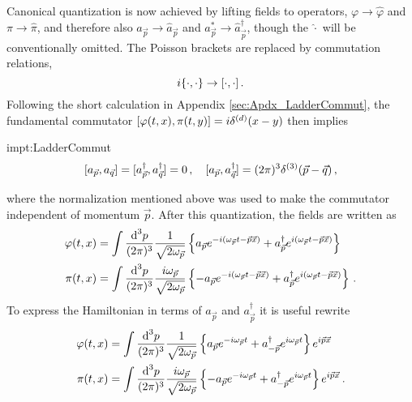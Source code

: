 Canonical quantization is now achieved by lifting fields to operators, $\varphi\to\hat{\varphi}$ and $\pi\to\hat{\pi}$, and therefore also $a_{\vec{p}}\to\hat{a}_{\vec{p}}$ and $a_{\vec{p}}^*\to\hat{a}_{\vec{p}}^\dagger$, though the $\hat{\cdot}$ will be conventionally omitted. The Poisson brackets are replaced by commutation relations,
\begin{equation}
    {i}\{\cdot,\cdot\}\to{[\cdot,\cdot]}\,.
\end{equation}
Following the short calculation in Appendix \ref{sec:Apdx_LadderCommut}, the fundamental commutator ${{[\varphi(t,x),\pi(t,y)]}={i}\delta^{(d)}(x-y)}$ then implies
\begin{impt}{impt:LadderCommut}
    \begin{equation}
        {[a_{\vec{p}},a_{\vec{q}}]}={[a_{\vec{p}}^\dagger,a_{\vec{q}}^\dagger]}=0\,,\quad{[a_{\vec{p}},a_{\vec{q}}^\dagger]}=(2\pi)^3\delta^{(3)}(\vec{p}-\vec{q})\,,
        \label{eq:LadderOpsCommut}
    \end{equation}
\end{impt}
where the normalization mentioned above was used to make the commutator independent of momentum $\vec{p}$. After this quantization, the fields are written as
\begin{subequations}
    \begin{align}
        \varphi(t,x)               & =\int\frac{\text{d} ^3p}{(2\pi)^3}\frac{1}{\sqrt{2\omega_{\vec{p}}}}\left\{a_{\vec{p}}e^{-{i}(\omega_{\vec{p}}t-\vec{p}\vec{x})}+a_{\vec{p}}^\dagger e^{{i}(\omega_{\vec{p}}t-\vec{p}\vec{x})}\right\}                                                 \label{eq:CanonicalQuant_RealScalar}\\
       \pi(t,x) & =\int\frac{\text{d} ^3p}{(2\pi)^3}\frac{{i}\omega_{\vec{p}}}{\sqrt{2\omega_{\vec{p}}}}\left\{-a_{\vec{p}}e^{-{i}(\omega_{\vec{p}}t-\vec{p}\vec{x})}+a_{\vec{p}}^\dagger e^{{i}(\omega_{\vec{p}}t-\vec{p}\vec{x})}\right\}\,.
    \end{align}
\end{subequations}
To express the Hamiltonian in terms of $a_{\vec{p}}$ and $a_{\vec{p}}^\dagger$ it is useful rewrite
\begin{subequations}
    \begin{align}
        \varphi(t,x)               & =\int\frac{\text{d} ^3p}{(2\pi)^3}\frac{1}{\sqrt{2\omega_{\vec{p}}}}\left\{a_{\vec{p}}e^{-{i}\omega_{\vec{p}}t}+a_{-\vec{p}}^\dagger e^{{i}\omega_{\vec{p}}t}\right\}e^{{i}\vec{p}\vec{x}}                                             \\
        \pi(t,x) & =\int\frac{\text{d} ^3p}{(2\pi)^3}\frac{{i}\omega_{\vec{p}}}{\sqrt{2\omega_{\vec{p}}}}\left\{-a_{\vec{p}}e^{-{i}\omega_{\vec{p}}t}+a_{-\vec{p}}^\dagger e^{{i}\omega_{\vec{p}}t}\right\}e^{{i}\vec{p}\vec{x}}\,.
    \end{align}
\end{subequations}
